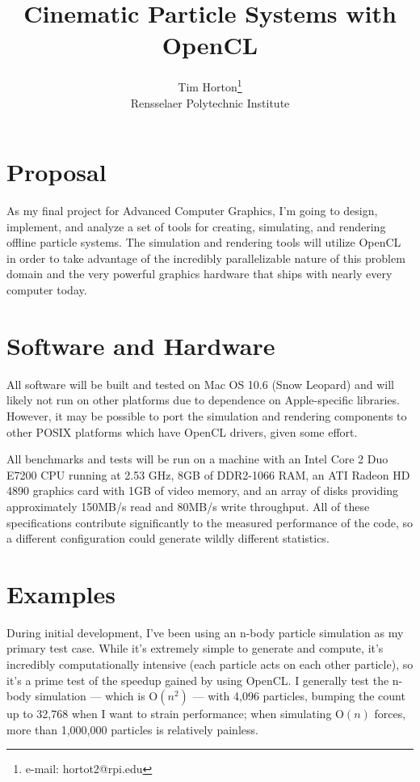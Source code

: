 \documentclass{acmsiggraph}
\title{Cinematic Particle Systems with OpenCL}
\author{Tim Horton\thanks{e-mail: hortot2@rpi.edu}\\Rensselaer Polytechnic Institute}
\begin{document}
\maketitle

\section{Proposal}

As my final project for Advanced Computer Graphics, I'm going to design, implement, and analyze a set of tools for creating, simulating, and rendering offline particle systems. The simulation and rendering tools will utilize OpenCL in order to take advantage of the incredibly parallelizable nature of this problem domain and the very powerful graphics hardware that ships with nearly every computer today.

\section{Software and Hardware}

All software will be built and tested on Mac OS 10.6 (Snow Leopard) and will likely not run on other platforms due to dependence on Apple-specific libraries. However, it may be possible to port the simulation and rendering components to other POSIX platforms which have OpenCL drivers, given some effort.

All benchmarks and tests will be run on a machine with an Intel Core 2 Duo E7200 CPU running at 2.53 GHz, 8GB of DDR2-1066 RAM, an ATI Radeon HD 4890 graphics card with 1GB of video memory, and an array of disks providing approximately 150MB/s read and 80MB/s write throughput. All of these specifications contribute significantly to the measured performance of the code, so a different configuration could generate wildly different statistics.

\section{Examples}

During initial development, I've been using an n-body particle simulation as my primary test case. While it's extremely simple to generate and compute, it's incredibly computationally intensive (each particle acts on each other particle), so it's a prime test of the speedup gained by using OpenCL. I generally test the n-body simulation --- which is $\textrm{O}(n^2)$ --- with 4,096 particles, bumping the count up to 32,768 when I want to strain performance; when simulating $\textrm{O}(n)$ forces, more than 1,000,000 particles is relatively painless.
\end{document}
